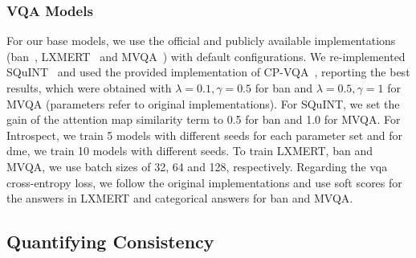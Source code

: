 \subsubsection{VQA Models}
For our base models, we use the official and publicly available implementations (\gls{ban}~\cite{jackroos2019}, LXMERT~\cite{tan2019lxmert} and MVQA~\cite{tascon2022consistency}) with default configurations. We re-implemented SQuINT~\cite{selvaraju2020squinting} and used the provided implementation of CP-VQA~\cite{tascon2022consistency}, reporting the best results, which were obtained with $\lambda=0.1, \gamma=0.5$ for \gls{ban} and $\lambda=0.5, \gamma=1$ for MVQA (parameters refer to original implementations). For SQuINT, we set the gain of the attention map similarity term to 0.5 for \gls{ban} and 1.0 for MVQA. For Introspect, we train 5 models with different seeds for each parameter set and for \gls{dme}, we train 10 models with different seeds. To train LXMERT, \gls{ban} and MVQA, we use batch sizes of 32, 64 and 128, respectively. Regarding the \gls{vqa} cross-entropy loss, we follow the original implementations and use soft scores for the answers in LXMERT and categorical answers for \gls{ban} and MVQA.

\subsection{Quantifying Consistency}

